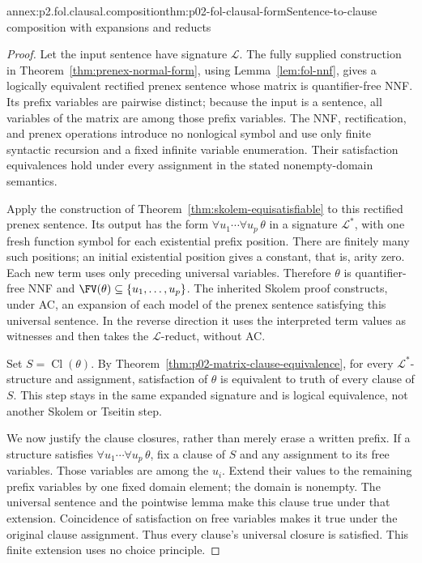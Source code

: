 \begin{annexitem}{annex:p2.fol.clausal.composition}{thm:p02-fol-clausal-form}{Sentence-to-clause composition with expansions and reducts}
\begin{proof}
Let the input sentence have signature \(\mathcal L\).
The fully supplied construction in
Theorem~\ref{thm:prenex-normal-form}, using
Lemma~\ref{lem:fol-nnf}, gives a logically equivalent rectified
prenex sentence whose matrix is quantifier-free NNF.  Its prefix
variables are pairwise distinct; because the input is a sentence,
all variables of the matrix are among those prefix variables.
The NNF, rectification, and prenex operations introduce no nonlogical
symbol and use only finite syntactic recursion and a fixed infinite
variable enumeration.  Their satisfaction equivalences hold under
every assignment in the stated nonempty-domain semantics.

Apply the construction of Theorem~\ref{thm:skolem-equisatisfiable}
to this rectified prenex sentence.  Its output has the form
\(\forall u_1\cdots\forall u_p\,\theta\) in a signature
\(\mathcal L^*\), with one fresh function symbol for each
existential prefix position.  There are finitely many such positions;
an initial existential position gives a constant, that is, arity zero.
Each new term uses only preceding universal variables.  Therefore
\(\theta\) is quantifier-free NNF and
\(\FV(\theta)\subseteq\{u_1,\ldots,u_p\}\).
The inherited Skolem proof constructs, under AC, an expansion of
each model of the prenex sentence satisfying this universal sentence.
In the reverse direction it uses the interpreted term values as
witnesses and then takes the \(\mathcal L\)-reduct, without AC.

Set \(S=\operatorname{Cl}(\theta)\).  By
Theorem~\ref{thm:p02-matrix-clause-equivalence}, for every
\(\mathcal L^*\)-structure and assignment, satisfaction of
\(\theta\) is equivalent to truth of every clause of \(S\).
This step stays in the same expanded signature and is logical
equivalence, not another Skolem or Tseitin step.

We now justify the clause closures, rather than merely erase a
written prefix.  If a structure satisfies
\(\forall u_1\cdots\forall u_p\,\theta\), fix a clause of
\(S\) and any assignment to its free variables.  Those variables
are among the \(u_i\).  Extend their values to the remaining
prefix variables by one fixed domain element; the domain is nonempty.
The universal sentence and the pointwise lemma make this clause true
under that extension.  Coincidence of satisfaction on free variables
makes it true under the original clause assignment.  Thus every
clause's universal closure is satisfied.  This finite extension uses
no choice principle.


\end{proof}
\end{annexitem}

